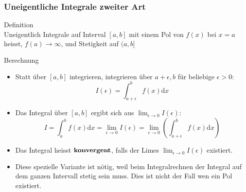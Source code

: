 \subsubsection{Uneigentliche Integrale zweiter Art}
	\begin{definition}{Definition}\\
		Uneigentlich Integrale auf Interval \([a,b]\) mit einem Pol von \(f(x)\) bei \(x=a\) heisst,
		\(f(a) \rightarrow \infty\), und Stetigkeit auf \((a,b]\)
  \end{definition}
  \begin{KR}{Berechnung}
	  \begin{itemize}
	  	
\item Statt über \([a,b]\) integrieren, integrieren über \(a+\epsilon,b\) für beliebige \(\epsilon>0\):
	\[I(\epsilon)=\int_{a+\epsilon}^b{f(x)\mathrm{d}x}\]
\item Das Integral über \([a,b]\) ergibt sich aus \(\lim_{\epsilon \rightarrow 0}I(\epsilon)\):
	\[I=\int_a^b{f(x)\mathrm{d}x}=\underset{\epsilon \rightarrow 0}{\lim}I(\epsilon)=\underset{\epsilon \rightarrow
	0}{\lim}\left(\int_{a+\epsilon}^b{f(x)\mathrm{d}x}\right) \]
\item Das Integral heisst \(\bold{konvergent}\), falls der Limes \(\lim_{\epsilon \rightarrow 0}I(\epsilon)\) existiert.
\item Diese spezielle Variante ist nötig, weil beim Integralrechnen der Integral auf dem ganzen Intervall stetig sein
	muss. Dies ist nicht der Fall wen ein Pol existiert.
\end{itemize}
  \end{KR}


